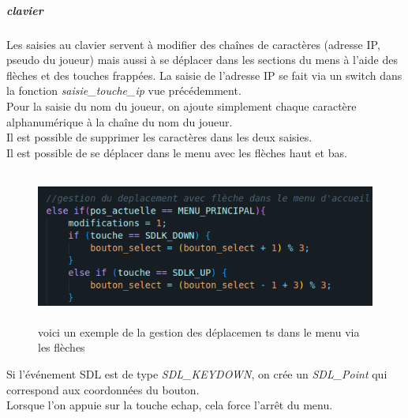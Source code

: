 \documentclass[11pt]{article}
\begin{document}
                    \subparagraph{clavier}\leavevmode\newline
                    Les saisies au clavier servent à modifier des chaînes de caractères (adresse IP, pseudo du joueur) mais aussi à se déplacer dans les sections du mens à l’aide des flèches et des touches frappées. La saisie de l’adresse IP se fait via un switch dans la fonction \textit{saisie\_touche\_ip} vue précédemment. \\
                    Pour la saisie du nom du joueur, on ajoute simplement chaque caractère alphanumérique à la chaîne du nom du joueur. \\
                    Il est possible de supprimer les caractères dans les deux saisies.\\
                    Il est possible de se déplacer dans le menu avec les flèches haut et bas.\\
                    \begin{figure}[H]
                        \centering
                        \includegraphics[height=5cm]{codeMenu.png}
                        \caption{voici un exemple de la gestion des déplacemen ts dans le menu via les flèches}
                        \label{fig:codeMenu}
                    \end{figure}
                    Si l’événement SDL est de type \textit{SDL\_KEYDOWN}, on crée un \textit{SDL\_Point} qui correspond aux coordonnées du bouton. \\
                    Lorsque l’on appuie sur la touche echap, cela force l’arrêt du menu.
\end{document}
